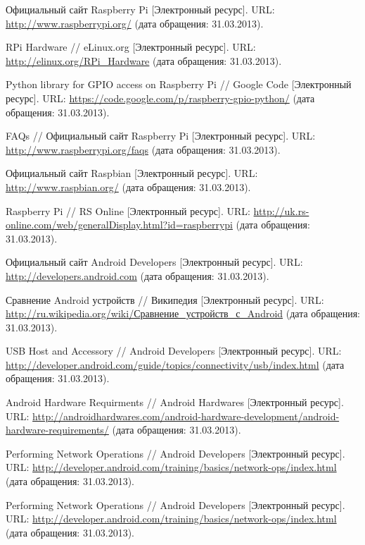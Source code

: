 \documentclass[twoside,a4paper]{msmb} %
\begin{document}
\begin{thebibliography}{99}
Официальный сайт Raspberry Pi [Электронный ресурс].
URL: \url{http://www.raspberrypi.org/} (дата обращения: 31.03.2013).

RPi Hardware // eLinux.org [Электронный ресурс]. 
URL: \url{http://elinux.org/RPi_Hardware} (дата обращения: 31.03.2013).

Python library for GPIO access on Raspberry Pi // Google Code [Электронный ресурс].
URL: \url{https://code.google.com/p/raspberry-gpio-python/} (дата обращения: 31.03.2013).

FAQs // Официальный сайт Raspberry Pi [Электронный ресурс].
URL: \url{http://www.raspberrypi.org/faqs} (дата обращения: 31.03.2013).

Официальный сайт Raspbian [Электронный ресурс].
URL: \url{http://www.raspbian.org/} (дата обращения: 31.03.2013).

Raspberry Pi // RS Online [Электронный ресурс].
URL: \url{http://uk.rs-online.com/web/generalDisplay.html?id=raspberrypi} (дата обращения: 31.03.2013).


Официальный сайт Android Developers [Электронный ресурс].
URL: \url{http://developers.android.com} (дата обращения: 31.03.2013).

Сравнение Android устройств // Википедия [Электронный ресурс].
URL: \url{http://ru.wikipedia.org/wiki/Сравнение_устройств_с_Android} (дата обращения: 31.03.2013).

USB Host and Accessory // Android Developers [Электронный ресурс].
URL: \url{http://developer.android.com/guide/topics/connectivity/usb/index.html} (дата обращения: 31.03.2013).

Android Hardware Requirments // Android Hardwares [Электронный ресурс].
URL: \url{http://androidhardwares.com/android-hardware-development/android-hardware-requirements/} (дата обращения: 31.03.2013).

Performing Network Operations // Android Developers [Электронный ресурс].
URL: \url{http://developer.android.com/training/basics/network-ops/index.html} (дата обращения: 31.03.2013).

Performing Network Operations // Android Developers [Электронный ресурс].
URL: \url{http://developer.android.com/training/basics/network-ops/index.html} (дата обращения: 31.03.2013).


\end{thebibliography}
\end{document}
